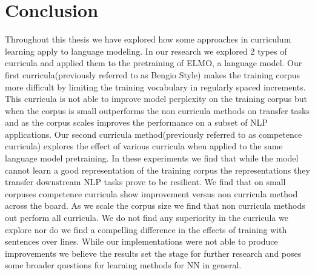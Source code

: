 \chapter{Conclusion}
Throughout this thesis we have explored how some approaches in curriculum learning apply to language modeling. In our research we explored 2 types of curricula and applied them to the pretraining of ELMO, a language model. Our first curricula(previously referred to as Bengio Style) makes the training corpus more difficult by limiting the training vocabulary in regularly spaced increments. This curricula is not able to improve model perplexity on the training corpus but when the corpus is small outperforms the non curricula methods on transfer tasks and as the corpus scales improves the performance on a subset of NLP applications. Our second curricula method(previously referred to as competence curricula) explores the effect of various curricula when applied to the same language model pretraining. In these experiments we find that while the model cannot learn a good representation of the training corpus the representations they transfer downstream NLP tasks prove to be resilient. We find that on small corpuses competence curricula show improvement versus non curricula method across the board. As we scale the corpus size we find that non curricula methods out perform all curricula. We do not find any superiority in the curricula we explore nor do we find a compelling difference in the effects of training with sentences over lines. While our implementations were not able to produce improvements we believe the results set the stage for further research and poses some broader questions for learning methods for NN in general. 